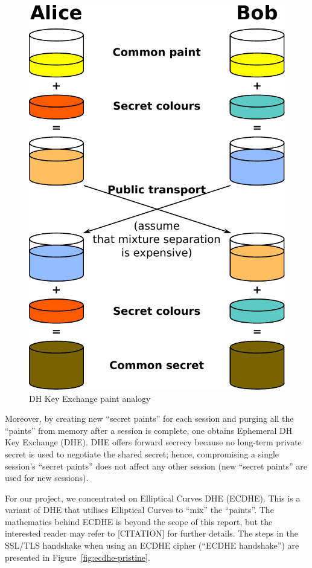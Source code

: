 \documentclass[../../main.tex]{subfiles}
\begin{document}
\begin{figure}[H]
  \centering
  \includegraphics[scale=0.4]{images/paint_color.pdf}
  \caption{DH Key Exchange paint analogy \cite{paints}}
  \label{fig:paint}
\end{figure}
Moreover, by creating new ``secret paints'' for each session and
purging all the ``paints'' from memory after a session is complete,
one obtains Ephemeral DH Key Exchange (DHE). DHE offers forward
secrecy because no long-term private secret is used to negotiate the
shared secret; hence, compromising a single session's ``secret
paints'' does not affect any other session (new ``secret paints'' are
used for new sessions).

For our project, we concentrated on Elliptical Curves DHE (ECDHE).
This is a variant of DHE that utilises Elliptical Curves to ``mix''
the ``paints''. The mathematics behind ECDHE is beyond the scope of
this report, but the interested reader may refer to [CITATION] for
further details. The steps in the SSL/TLS handshake when using an
ECDHE cipher (``ECDHE handshake'') are presented in
Figure~\ref{fig:ecdhe-pristine}.
\end{document}

